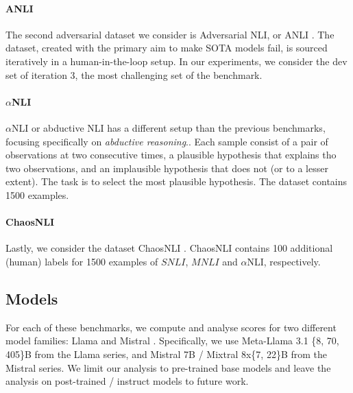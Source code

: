 \vspace{-1mm}
\paragraph{ANLI}
The second adversarial dataset we consider is Adversarial NLI, or ANLI \citep{nie-etal-2020-adversarial}.
The dataset, created with the primary aim to make SOTA models fail, is sourced iteratively in a human-in-the-loop setup.
In our experiments, we consider the dev set of iteration 3, the most challenging set of the benchmark.

\vspace{-1mm}
\paragraph{$\alpha$NLI}
$\alpha$NLI or abductive NLI \citep{bhagavatula2020abductive} has a different setup than the previous benchmarks, focusing specifically on \emph{abductive reasoning}..
Each sample consist of a pair of observations at two consecutive times, a plausible hypothesis that explains tho two observations, and an implausible hypothesis that does not (or to a lesser extent).
The task is to select the most plausible hypothesis.
The dataset contains 1500 examples.

\vspace{-1mm}
\paragraph{ChaosNLI}
Lastly, we consider the dataset ChaosNLI \citep{nie-etal-2020-learn}.
ChaosNLI contains 100 additional (human) labels for 1500 examples of $SNLI$, $MNLI$ and $\alpha$NLI, respectively.

\subsection{Models} For each of these benchmarks, we compute and analyse scores for two different model families: Llama \citep{dubey2024llama} and Mistral \citep{jiang2023mistral, jiang2024mixtral}. 
Specifically, we use Meta-Llama 3.1 \{8, 70, 405\}B from the Llama series, and Mistral 7B / Mixtral 8x\{7, 22\}B from the Mistral series.
We limit our analysis to pre-trained base models and leave the analysis on post-trained / instruct models to future work.

